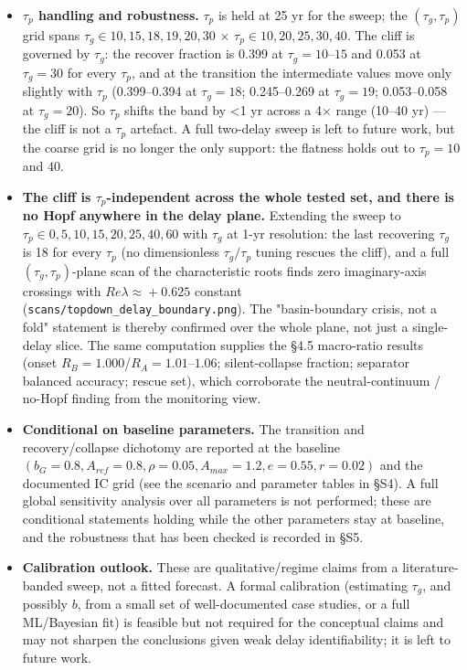 \documentclass[11pt]{article}
\begin{document}
\begin{itemize}
\item \textbf{$\tau{}_{p}$ handling and robustness.} $\tau{}_{p}$ is held at 25 yr for the sweep; the $(\tau{}_{g}, \tau{}_{p})$ grid spans $\tau{}_{g} \in{} {10,15,18,19,20,30}$ \ensuremath{\times{}} $\tau{}_{p} \in{} {10,20,25,30,40}$. The cliff is governed by $\tau{}_{g}$: the recover fraction is 0.399 at $\tau{}_{g} = 10–15$ and 0.053 at $\tau{}_{g} = 30$ for every $\tau{}_{p}$, and at the transition the intermediate values move only slightly with $\tau{}_{p}$ (0.399–0.394 at $\tau{}_{g}=18$; 0.245–0.269 at $\tau{}_{g}=19$; 0.053–0.058 at $\tau{}_{g}=20$). So $\tau{}_{p}$ shifts the band by <1 yr across a 4\ensuremath{\times{}} range (10–40 yr) — the cliff is not a $\tau{}_{p}$ artefact. A full two-delay sweep is left to future work, but the coarse grid is no longer the only support: the flatness holds out to $\tau{}_{p} = 10$ and $40$.
\item \textbf{The cliff is $\tau{}_{p}$-independent across the whole tested set, and there is no Hopf anywhere in the delay plane.} Extending the sweep to $\tau{}_{p} \in{} {0,5,10,15,20,25,40,60}$ with $\tau{}_{g}$ at 1-yr resolution: the last recovering $\tau{}_{g}$ is 18 for every $\tau{}_{p}$ (no dimensionless $\tau{}_{g}/\tau{}_{p}$ tuning rescues the cliff), and a full $(\tau{}_{g}, \tau{}_{p})$-plane scan of the characteristic roots finds zero imaginary-axis crossings with $Re \lambda{} \approx{} +0.625$ constant (\texttt{scans/topdown\_delay\_boundary.png}). The "basin-boundary crisis, not a fold" statement is thereby confirmed over the whole plane, not just a single-delay slice. The same computation supplies the §4.5 macro-ratio results (onset $R_{B}=1.000$/$R_{A}=1.01–1.06$; silent-collapse fraction; separator balanced accuracy; rescue set), which corroborate the neutral-continuum / no-Hopf finding from the monitoring view.
\item \textbf{Conditional on baseline parameters.} The transition and recovery/collapse dichotomy are reported at the baseline $(b_{G}=0.8, A_{ref}=0.8, \rho{}=0.05, A_{max}=1.2, e=0.55, r=0.02)$ and the documented IC grid (see the scenario and parameter tables in §S4). A full global sensitivity analysis over all parameters is not performed; these are conditional statements holding while the other parameters stay at baseline, and the robustness that has been checked is recorded in §S5.
\item \textbf{Calibration outlook.} These are qualitative/regime claims from a literature-banded sweep, not a fitted forecast. A formal calibration (estimating $\tau{}_{g}$, and possibly $b$, from a small set of well-documented case studies, or a full ML/Bayesian fit) is feasible but not required for the conceptual claims and may not sharpen the conclusions given weak delay identifiability; it is left to future work.

\end{itemize}
\end{document}
